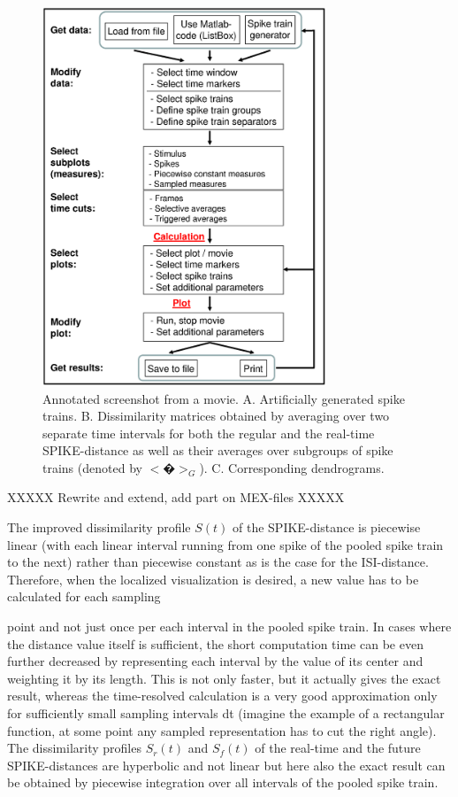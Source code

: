\documentclass[10pt,twocolumn]{elsart5p}
\begin{document}
%
\begin{figure}
    \includegraphics[width=85mm]{Fig3-SPIKY-Flowchart.eps}
    \caption{\abb\label{fig:Fig3-SPIKY-Flowchart} Annotated screenshot from a movie.   A. Artificially generated spike trains.   B. Dissimilarity matrices obtained by averaging over two separate time intervals for both the regular and the real-time SPIKE-distance as well as their averages over subgroups of spike trains (denoted by $<�>_G$).   C. Corresponding dendrograms.}
\end{figure}

XXXXX Rewrite and extend, add part on MEX-files XXXXX

The improved dissimilarity profile $S (t)$ of the SPIKE-distance is piecewise linear (with each linear interval running
from one spike of the pooled spike train to the next) rather than piecewise constant as is the case for the ISI-distance.
Therefore, when the localized visualization is desired, a new value has to be calculated for each sampling

point and not just once per each interval in the pooled spike train. In cases where the distance value itself is sufficient,
the short computation time can be even further decreased by representing each interval by the value of its center and
weighting it by its length. This is not only faster, but it actually gives the exact result, whereas the time-resolved calculation is a very good approximation only for sufficiently small sampling intervals dt (imagine the example of a rectangular
function, at some point any sampled representation has to cut the right angle). The dissimilarity profiles $S_r(t)$
and $S_f (t)$ of the real-time and the future SPIKE-distances are hyperbolic and not linear but here also the exact result
can be obtained by piecewise integration over all intervals of the pooled spike train.
\end{document}
